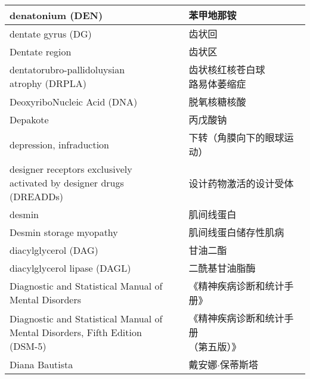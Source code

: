 \begin{longtable}{lll}
	\midrule
	denatonium (DEN)   && 苯甲地那铵 \\
	
	\midrule
	dentate gyrus (DG)     && 齿状回 \\
	
	\midrule
	Dentate region     && 齿状区 \\
	
	\midrule
	\makecell[l]{dentatorubro-pallidoluysian\\ atrophy (DRPLA)}     &&  \makecell[l]{齿状核红核苍白球\\路易体萎缩症}  \\
	
	\midrule
	DeoxyriboNucleic Acid (DNA)     &&  脱氧核糖核酸  \\
	
	\midrule
	Depakote     &&  丙戊酸钠  \\
	
	\midrule
	depression, infraduction     &&  下转（角膜向下的眼球运动）  \\
	
	\midrule
	\makecell[l]{designer receptors exclusively\\ activated by designer drugs (DREADDs)}    &&  设计药物激活的设计受体  \\
	
	\midrule
	desmin   &&  肌间线蛋白  \\
	
	\midrule
	Desmin storage myopathy   &&  肌间线蛋白储存性肌病  \\
	
	\midrule
	diacylglycerol  (DAG)   &&  甘油二酯  \\
	
	\midrule
	diacylglycerol lipase  (DAGL)   &&  二酰基甘油脂酶  \\
	
	\midrule
	\makecell[l]{Diagnostic and Statistical Manual of \\Mental Disorders}     &&  《精神疾病诊断和统计手册》  \\
	
	\midrule
	\makecell[l]{Diagnostic and Statistical Manual of \\Mental Disorders, Fifth Edition (DSM-5)}     &&  \makecell[l]{《精神疾病诊断和统计手册\\（第五版）》}  \\
	
	\midrule
	Diana Bautista    &&  戴安娜$\cdot$保蒂斯塔  \\
	

\end{longtable}
